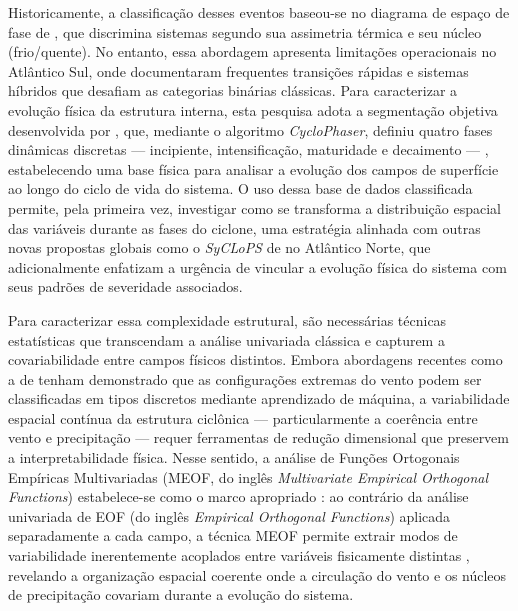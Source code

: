 Historicamente, a classificação desses eventos baseou-se no diagrama de espaço de fase de \citet{hart2003cyclone}, que discrimina sistemas segundo sua assimetria térmica e seu núcleo (frio/quente). No entanto, essa abordagem apresenta limitações operacionais no Atlântico Sul, onde \citet{reboita2022from} documentaram frequentes transições rápidas e sistemas híbridos que desafiam as categorias binárias clássicas. Para caracterizar a evolução física da estrutura interna, esta pesquisa adota a segmentação objetiva desenvolvida por \citet{coutodesouza2024new}, que, mediante o algoritmo \textit{CycloPhaser}, definiu quatro fases dinâmicas discretas — incipiente, intensificação, maturidade e decaimento — \citep{deSouza2025CycloPhaser}, estabelecendo uma base física para analisar a evolução dos campos de superfície ao longo do ciclo de vida do sistema. O uso dessa base de dados classificada permite, pela primeira vez, investigar como se transforma a distribuição espacial das variáveis durante as fases do ciclone, uma estratégia alinhada com outras novas propostas globais como o \textit{SyCLoPS} de \citet{han2025system} no Atlântico Norte, que adicionalmente enfatizam a urgência de vincular a evolução física do sistema com seus padrões de severidade associados.

\label{subsec:intro_estrategia_estadistica}%
Para caracterizar essa complexidade estrutural, são necessárias técnicas estatísticas que transcendam a análise univariada clássica e capturem a covariabilidade entre campos físicos distintos. Embora abordagens recentes como a de \citet{eisenstein2023identification} tenham demonstrado que as configurações extremas do vento podem ser classificadas em tipos discretos mediante aprendizado de máquina, a variabilidade espacial contínua da estrutura ciclônica --- particularmente a coerência entre vento e precipitação --- requer ferramentas de redução dimensional que preservem a interpretabilidade física. Nesse sentido, a análise de Funções Ortogonais Empíricas Multivariadas (MEOF, do inglês \textit{Multivariate Empirical Orthogonal Functions}) estabelece-se como o marco apropriado \citep{hannachi2007empirical}: ao contrário da análise univariada de EOF (do inglês \textit{Empirical Orthogonal Functions}) aplicada separadamente a cada campo, a técnica MEOF permite extrair modos de variabilidade inerentemente acoplados entre variáveis fisicamente distintas \citep{liang2018multivariate}, revelando a organização espacial coerente onde a circulação do vento e os núcleos de precipitação covariam durante a evolução do sistema.

